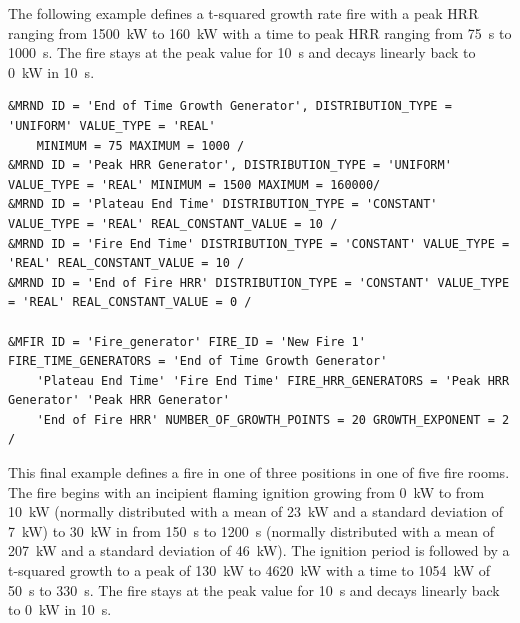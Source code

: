 \documentclass[12pt,twoside]{book}
\begin{document}
The following example defines a t-squared growth rate fire with a peak HRR ranging from 1500~kW to 160~kW with a time to peak HRR ranging from 75~s to 1000~s. The fire stays at the peak value for 10~s and decays linearly back to 0~kW in 10~s.

\begin{lstlisting}[basicstyle=\scriptsize]
&MRND ID = 'End of Time Growth Generator', DISTRIBUTION_TYPE = 'UNIFORM' VALUE_TYPE = 'REAL'
    MINIMUM = 75 MAXIMUM = 1000 /
&MRND ID = 'Peak HRR Generator', DISTRIBUTION_TYPE = 'UNIFORM' VALUE_TYPE = 'REAL' MINIMUM = 1500 MAXIMUM = 160000/
&MRND ID = 'Plateau End Time' DISTRIBUTION_TYPE = 'CONSTANT' VALUE_TYPE = 'REAL' REAL_CONSTANT_VALUE = 10 /
&MRND ID = 'Fire End Time' DISTRIBUTION_TYPE = 'CONSTANT' VALUE_TYPE = 'REAL' REAL_CONSTANT_VALUE = 10 /
&MRND ID = 'End of Fire HRR' DISTRIBUTION_TYPE = 'CONSTANT' VALUE_TYPE = 'REAL' REAL_CONSTANT_VALUE = 0 /

&MFIR ID = 'Fire_generator' FIRE_ID = 'New Fire 1' FIRE_TIME_GENERATORS = 'End of Time Growth Generator'
    'Plateau End Time' 'Fire End Time' FIRE_HRR_GENERATORS = 'Peak HRR Generator' 'Peak HRR Generator'
    'End of Fire HRR' NUMBER_OF_GROWTH_POINTS = 20 GROWTH_EXPONENT = 2 /
\end{lstlisting}

This final example defines a fire in one of three positions in one of five fire rooms. The fire begins with an incipient flaming ignition growing from 0~kW to from 10~kW (normally distributed with a mean of 23~kW and a standard deviation of 7~kW) to 30~kW in from 150~s to 1200~s (normally distributed with a mean of 207~kW and a standard deviation of 46~kW). The ignition period is followed by a t-squared growth to a peak of 130~kW to 4620~kW with a time to 1054~kW of 50~s to 330~s. The fire stays at the peak value for 10~s and decays linearly back to 0~kW in 10~s.
\end{document}
